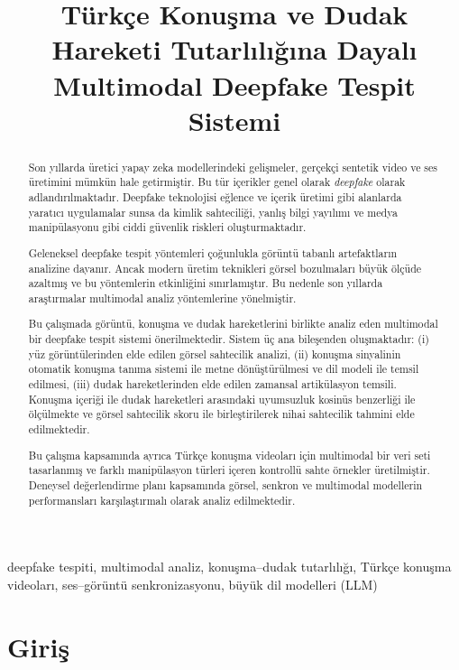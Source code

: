 \documentclass[conference]{IEEEtran}
\title{Türkçe Konuşma ve Dudak Hareketi Tutarlılığına Dayalı Multimodal Deepfake Tespit Sistemi}
\author{\IEEEauthorblockN{Ad Soyad}
\IEEEauthorblockA{\textit{Bölüm, Üniversite} \\
Şehir, Türkiye \\
email@adres.com}
}
\begin{document}
\maketitle

\begin{abstract}

Son yıllarda üretici yapay zeka modellerindeki gelişmeler, gerçekçi sentetik video ve ses üretimini mümkün hale getirmiştir. Bu tür içerikler genel olarak \textit{deepfake} olarak adlandırılmaktadır. Deepfake teknolojisi eğlence ve içerik üretimi gibi alanlarda yaratıcı uygulamalar sunsa da kimlik sahteciliği, yanlış bilgi yayılımı ve medya manipülasyonu gibi ciddi güvenlik riskleri oluşturmaktadır.

Geleneksel deepfake tespit yöntemleri çoğunlukla görüntü tabanlı artefaktların analizine dayanır. Ancak modern üretim teknikleri görsel bozulmaları büyük ölçüde azaltmış ve bu yöntemlerin etkinliğini sınırlamıştır. Bu nedenle son yıllarda araştırmalar multimodal analiz yöntemlerine yönelmiştir.

Bu çalışmada görüntü, konuşma ve dudak hareketlerini birlikte analiz eden multimodal bir deepfake tespit sistemi önerilmektedir. Sistem üç ana bileşenden oluşmaktadır: (i) yüz görüntülerinden elde edilen görsel sahtecilik analizi, (ii) konuşma sinyalinin otomatik konuşma tanıma sistemi ile metne dönüştürülmesi ve dil modeli ile temsil edilmesi, (iii) dudak hareketlerinden elde edilen zamansal artikülasyon temsili. Konuşma içeriği ile dudak hareketleri arasındaki uyumsuzluk kosinüs benzerliği ile ölçülmekte ve görsel sahtecilik skoru ile birleştirilerek nihai sahtecilik tahmini elde edilmektedir.

Bu çalışma kapsamında ayrıca Türkçe konuşma videoları için multimodal bir veri seti tasarlanmış ve farklı manipülasyon türleri içeren kontrollü sahte örnekler üretilmiştir. Deneysel değerlendirme planı kapsamında görsel, senkron ve multimodal modellerin performansları karşılaştırmalı olarak analiz edilmektedir.

\end{abstract}

\begin{IEEEkeywords}
deepfake tespiti, multimodal analiz, konuşma--dudak tutarlılığı, Türkçe konuşma videoları, ses--görüntü senkronizasyonu, büyük dil modelleri (LLM)
\end{IEEEkeywords}

\section{Giriş}
\end{document}
